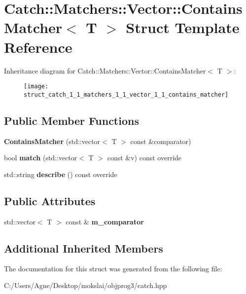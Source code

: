 \hypertarget{struct_catch_1_1_matchers_1_1_vector_1_1_contains_matcher}{}\section{Catch\+:\+:Matchers\+:\+:Vector\+:\+:Contains\+Matcher$<$ T $>$ Struct Template Reference}
\label{struct_catch_1_1_matchers_1_1_vector_1_1_contains_matcher}
Inheritance diagram for Catch\+:\+:Matchers\+:\+:Vector\+:\+:Contains\+Matcher$<$ T $>$\+:\begin{figure}[H]
\begin{center}
\leavevmode
\texttt{[image: struct\_catch\_1\_1\_matchers\_1\_1\_vector\_1\_1\_contains\_matcher]}
\end{center}
\end{figure}
\subsection*{Public Member Functions}
\begin{DoxyCompactItemize}
\item 
\mbox{\label{struct_catch_1_1_matchers_1_1_vector_1_1_contains_matcher_ad8e92c8399be6dce75bb5702cdfab700}} 
{\bfseries Contains\+Matcher} (std\+::vector$<$ T $>$ const \&comparator)
\item 
\mbox{\label{struct_catch_1_1_matchers_1_1_vector_1_1_contains_matcher_afd33467ae48a41a634572b41b053f67f}} 
bool {\bfseries match} (std\+::vector$<$ T $>$ const \&v) const override
\item 
\mbox{\label{struct_catch_1_1_matchers_1_1_vector_1_1_contains_matcher_abe6a9ea3d6506c9a1f75ff524f35832e}} 
std\+::string {\bfseries describe} () const override
\end{DoxyCompactItemize}
\subsection*{Public Attributes}
\begin{DoxyCompactItemize}
\item 
\mbox{\label{struct_catch_1_1_matchers_1_1_vector_1_1_contains_matcher_a83d051166e4ed0d535219ad6ee99abb2}} 
std\+::vector$<$ T $>$ const  \& {\bfseries m\+\_\+comparator}
\end{DoxyCompactItemize}
\subsection*{Additional Inherited Members}


The documentation for this struct was generated from the following file\+:\begin{DoxyCompactItemize}
\item 
C\+:/\+Users/\+Agne/\+Desktop/mokslai/objprog3/catch.\+hpp\end{DoxyCompactItemize}

